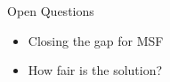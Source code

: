 \begin{frame}{Open Questions}
\begin{itemize}[<+->]
  \item Closing the gap for MSF   
  \item How fair is the solution?
\end{itemize}
\end{frame}